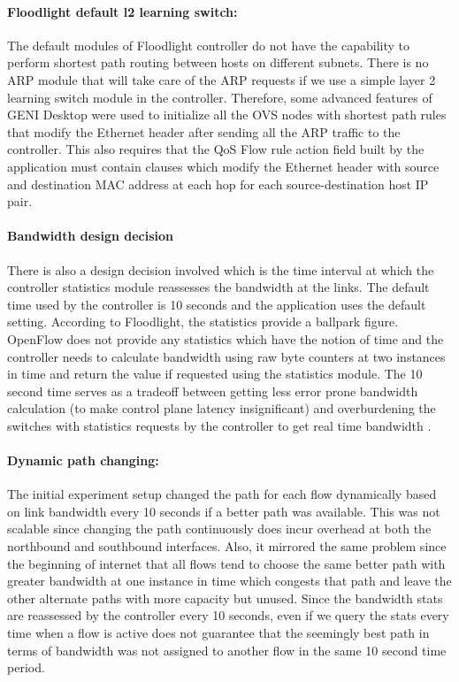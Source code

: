 \documentclass[paper=a4, fontsize=12pt]{scrartcl}	%
\numberwithin{equation}{section}		%
\numberwithin{figure}{section}			%
\numberwithin{table}{section}				%
\begin{document}
\paragraph{Floodlight default l2 learning switch:}
The default modules of Floodlight controller do not have the capability to perform shortest path routing between hosts on different subnets. There is no ARP module that will take care of the ARP requests if we use a simple layer 2 learning switch module in the controller. Therefore, some advanced features of GENI Desktop were used to initialize all the OVS nodes with shortest path rules that modify the Ethernet header after sending all the ARP traffic to the controller. This also requires that the QoS Flow rule action field built by the application must contain clauses which modify the Ethernet header with source and destination MAC address at each hop for each source-destination host IP pair.
\paragraph{Bandwidth design decision}
There is also a design decision involved which is the time interval at which the controller statistics module reassesses the bandwidth at the links. The default time used by the controller is 10 seconds and the application uses the default setting. According to Floodlight, the statistics provide a ballpark figure. OpenFlow does not provide any statistics which have the notion of time and the controller needs to calculate bandwidth using raw byte counters at two instances in time and return the value if requested using the statistics module. The 10 second time serves as a tradeoff between getting less error prone bandwidth calculation (to make control plane latency insignificant) and overburdening the switches with statistics requests by the controller to get real time bandwidth \cite{stats}.
\paragraph{Dynamic path changing:}
The initial experiment setup changed the path for each flow dynamically based on link bandwidth every 10 seconds if a better path was available. This was not scalable since changing the path continuously does incur overhead at both the northbound and southbound interfaces. Also, it mirrored the same problem since the beginning of internet that all flows tend to choose the same better path with greater bandwidth at one instance in time which congests that path and leave the other alternate paths with more capacity but unused. Since the bandwidth stats are reassessed by the controller every 10 seconds, even if we query the stats every time when a flow is active does not guarantee that the seemingly best path in terms of bandwidth was not assigned to another flow in the same 10 second time period.
\end{document}
